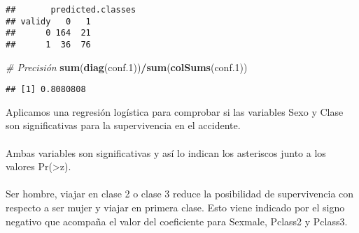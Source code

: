 \documentclass[
]{article}
\newenvironment{Shaded}{\begin{snugshade}}{\end{snugshade}}
\newcommand{\CommentTok}[1]{\textcolor[rgb]{0.56,0.35,0.01}{\textit{#1}}}
\newcommand{\DataTypeTok}[1]{\textcolor[rgb]{0.13,0.29,0.53}{#1}}
\newcommand{\DecValTok}[1]{\textcolor[rgb]{0.00,0.00,0.81}{#1}}
\newcommand{\FloatTok}[1]{\textcolor[rgb]{0.00,0.00,0.81}{#1}}
\newcommand{\KeywordTok}[1]{\textcolor[rgb]{0.13,0.29,0.53}{\textbf{#1}}}
\newcommand{\NormalTok}[1]{#1}
\newcommand{\OperatorTok}[1]{\textcolor[rgb]{0.81,0.36,0.00}{\textbf{#1}}}
\newcommand{\StringTok}[1]{\textcolor[rgb]{0.31,0.60,0.02}{#1}}
\begin{document}
\begin{Shaded}
\end{Shaded}

\begin{verbatim}
##       predicted.classes
## validy   0   1
##      0 164  21
##      1  36  76
\end{verbatim}

\begin{Shaded}
\begin{Highlighting}[]
\CommentTok{# Precisión}
\KeywordTok{sum}\NormalTok{(}\KeywordTok{diag}\NormalTok{(conf}\FloatTok{.1}\NormalTok{))}\OperatorTok{/}\KeywordTok{sum}\NormalTok{(}\KeywordTok{colSums}\NormalTok{(conf}\FloatTok{.1}\NormalTok{))}
\end{Highlighting}
\end{Shaded}

\begin{verbatim}
## [1] 0.8080808
\end{verbatim}

\texttt{}

Aplicamos una regresión logística para comprobar si las variables Sexo y
Clase son significativas para la supervivencia en el accidente.\\
\texttt{}~\\
Ambas variables son significativas y así lo indican los asteriscos junto
a los valores Pr(\textgreater\textbar z\textbar).\\
\texttt{}~\\
Ser hombre, viajar en clase 2 o clase 3 reduce la posibilidad de
supervivencia con respecto a ser mujer y viajar en primera clase. Esto
viene indicado por el signo negativo que acompaña el valor del
coeficiente para Sexmale, Pclass2 y Pclass3.\\
\texttt{}
\end{document}

